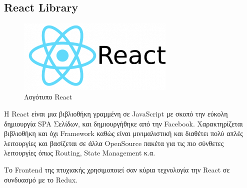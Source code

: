 \subsection{React Library}
\begin{figure}[h]
  \centering
  \includegraphics[width=75mm]{Chapters/3 - Technologies/Images/react-logo_1.png}
  \caption{Λογότυπο React}
  \label{fig:react-logo}
\end{figure}
Η React είναι μια βιβλιοθήκη γραμμένη σε JavaScript με σκοπό την εύκολη δημιουργία SPA Σελίδων, και δημιουργήθηκε από την Facebook.
Χαρακτηρίζεται βιβλιοθήκη και όχι Framework καθώς είναι μινιμαλιστική και διαθέτει πολύ απλές λειτουργίες και βασίζεται σε άλλα OpenSource πακέτα για τις πιο σύνθετες λειτουργίες όπως Routing, State Management κ.α.

Το Frontend της πτυχιακής χρησιμοποιεί σαν κύρια τεχνολογία την React σε συνδυασμό με το Redux.